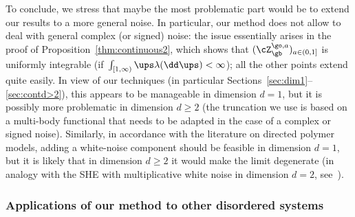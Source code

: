\begin{enumeratea}
\item
To conclude, we stress that maybe
the most problematic part
would be to extend our results to a more general noise.
In particular, our method does not allow to deal with
general complex (or signed) noise:
the issue essentially arises in the proof of Proposition~\ref{thm:continuous2}, which shows that $(\cZ_{\gb}^{\go,a})_{a\in (0,1]}$ is uniformly integrable (if~$\int_{[1,\infty)} \ups \lambda(\dd \ups)<\infty$); all the other points extend quite easily.
In view of our techniques (in particular Sections~\ref{sec:dim1}--\ref{sec:contd>2}), this appears to be manageable in dimension $d=1$, but it is possibly more problematic in dimension $d\ge 2$ (the truncation we use is based on a multi-body functional that needs to be adapted in the case of a complex or signed noise).
Similarly, in accordance with the literature on directed polymer models,
adding a white-noise component should be feasible
in dimension $d=1$, but it is likely that in dimension $d\geq 2$ it would make the limit degenerate
(in analogy with the SHE with multiplicative white noise in dimension $d=2$, see~\cite{CSZ18scaling, gu2019}).
\end{enumeratea}

\subsubsection{Applications of our method to other disordered systems}
\label{sec:extensions}

